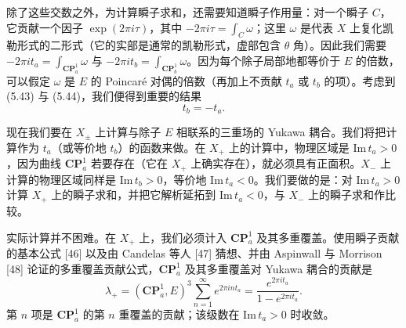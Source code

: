 除了这些交数之外，为计算瞬子求和，还需要知道瞬子作用量：对一个瞬子 $C$，它贡献一个因子 $\exp(2\pi i\tau)$，其中 $-2\pi i\tau=\int_{C}\omega$；这里 $\omega$ 是代表 $X$ 上复化凯勒形式的二形式（它的实部是通常的凯勒形式，虚部包含 $\theta$ 角）。因此我们需要 $-2\pi i t_{a}=\int_{\mathbf{CP}^{1}_{a}}\omega$ 与 $-2\pi i t_{b}=\int_{\mathbf{CP}^{1}_{b}}\omega$。因为每个除子局部地都等价于 $E$ 的倍数，可以假定 $\omega$ 是 $E$ 的 Poincaré 对偶的倍数（再加上不贡献 $t_{a}$ 或 $t_{b}$ 的项）。考虑到 (5.43) 与 (5.44)，我们便得到重要的结果
\begin{equation}
\tag{5.45}
t_{b}=-t_{a}.
\end{equation}


现在我们要在 $X_{\pm}$ 上计算与除子 $E$ 相联系的三重场的 Yukawa 耦合。我们将把计算作为 $t_{a}$（或等价地 $t_{b}$）的函数来做。在 $X_{+}$ 上的计算中，物理区域是 $\mathrm{Im}\,t_{a}>0$，因为曲线 $\mathbf{CP}^{1}_{a}$ 若要存在（它在 $X_{+}$ 上确实存在），就必须具有正面积。$X_{-}$ 上计算的物理区域同样是 $\mathrm{Im}\,t_{b}>0$，等价地 $\mathrm{Im}\,t_{a}<0$。我们要做的是：对 $\mathrm{Im}\,t_{a}>0$ 计算 $X_{+}$ 上的瞬子求和，并把它解析延拓到 $\mathrm{Im}\,t_{a}<0$，与 $X_{-}$ 上的瞬子求和作比较。

实际计算并不困难。在 $X_{+}$ 上，我们必须计入 $\mathbf{CP}^{1}_{a}$ 及其多重覆盖。使用瞬子贡献的基本公式 [46] 以及由 Candelas 等人 [47] 猜想、并由 Aspinwall 与 Morrison [48] 论证的多重覆盖贡献公式，$\mathbf{CP}^{1}_{a}$ 及其多重覆盖对 Yukawa 耦合的贡献是
\begin{equation}
\tag{5.46}
\lambda_{+}=(\mathbf{CP}^{1}_{a},E)^{3}\sum_{n=1}^{\infty}e^{2\pi i n t_{a}}=\frac{e^{2\pi i t_{a}}}{1-e^{2\pi i t_{a}}}.
\end{equation}
第 $n$ 项是 $\mathbf{CP}^{1}_{a}$ 的第 $n$ 重覆盖的贡献；该级数在 $\mathrm{Im}\,t_{a}>0$ 时收敛。


